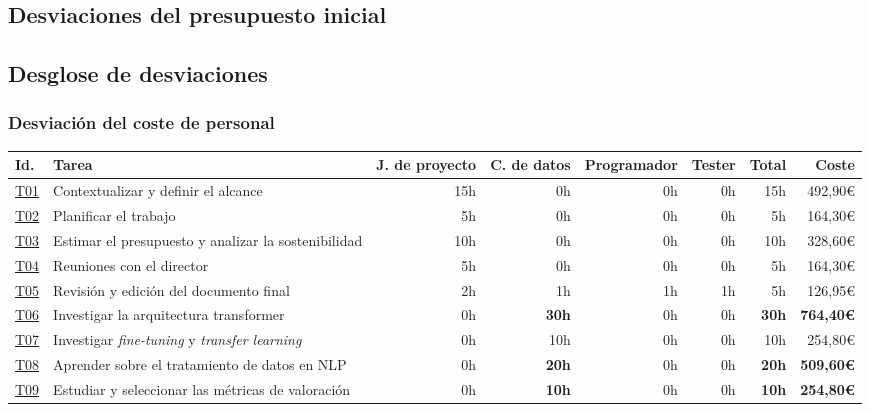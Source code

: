 \begin{landscape}
    \begin{table}
        \section{Desviaciones del presupuesto inicial}\label{desvpresini}
        \subsection{Desglose de desviaciones}
        \subsubsection{Desviación del coste de personal}
    \centering
    \begin{tabular}{  l  l  r  r  r  r  r  r  }
        Id. & Tarea & J. de proyecto & C. de datos & Programador & Tester & \textbf{Total} & \textbf{Coste} \\
        \hline
        \hyperref[T01]{T01} & Contextualizar y definir el alcance & 15h & 0h & 0h & 0h & 15h & 492,90\euro\\
        \hline
        \hyperref[T02]{T02} & Planificar el trabajo & 5h & 0h & 0h & 0h & 5h & 164,30\euro\\
        \hline
        \hyperref[T03]{T03} & Estimar el presupuesto y analizar la sostenibilidad & 10h & 0h & 0h & 0h & 10h & 328,60\euro\\
        \hline
        \hyperref[T04]{T04} & Reuniones con el director & 5h & 0h & 0h & 0h & 5h & 164,30\euro\\
        \hline
        \hyperref[T05]{T05} & Revisión y edición del documento final & 2h & 1h & 1h & 1h & 5h & 126,95\euro\\
        \hline
        \hyperref[T06]{T06} & Investigar la arquitectura transformer & 0h & \textbf{30h} & 0h & 0h & \textbf{30h} & \textbf{764,40\euro}\\
        \hline
        \hyperref[T07]{T07} & Investigar \textit{fine-tuning} y \textit{transfer learning} & 0h & 10h & 0h & 0h & 10h & 254,80\euro\\
        \hline
        \hyperref[T08]{T08} & Aprender sobre el tratamiento de datos en NLP & 0h & \textbf{20h} & 0h & 0h & \textbf{20h} & \textbf{509,60\euro}\\
        \hline
        \hyperref[T09]{T09} & Estudiar y seleccionar las métricas de valoración & 0h & \textbf{10h} & 0h & 0h & \textbf{10h} & \textbf{254,80\euro}\\

\end{tabular}
\end{table}
\end{landscape}
